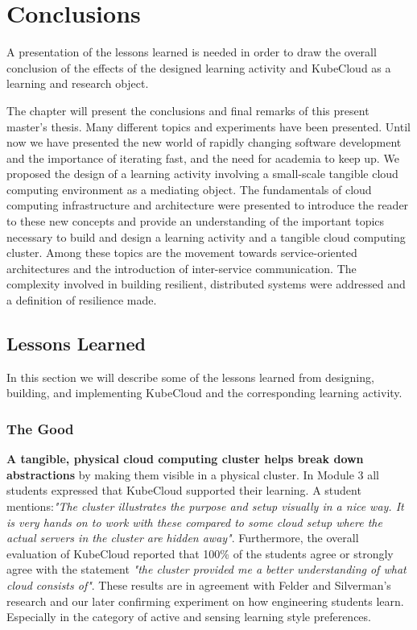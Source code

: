 \chapter{Conclusions}

\begin{theorem}
A presentation of the lessons learned is needed in order to draw the overall conclusion of the effects of the designed learning activity and KubeCloud as a learning and research object.
\end{theorem}

\noindent
The chapter will present the conclusions and final remarks of this present master's thesis. Many different topics and experiments have been presented. Until now we have presented the new world of rapidly changing software development and the importance of iterating fast, and the need for academia to keep up. We proposed the design of a learning activity involving a small-scale tangible cloud computing environment as a mediating object. The fundamentals of cloud computing infrastructure and architecture were presented to introduce the reader to these new concepts and provide an understanding of the important topics necessary to build and design a learning activity and a tangible cloud computing cluster. Among these topics are the movement towards service-oriented architectures and the introduction of inter-service communication. The complexity involved in building resilient, distributed systems were addressed and a definition of resilience made.


\section{Lessons Learned}
In this section we will describe some of the lessons learned from designing, building, and implementing KubeCloud and the corresponding learning activity.
\subsection*{The Good}

\textbf{A tangible, physical cloud computing cluster helps break down abstractions} by making them visible in a physical cluster. In Module 3 all students expressed that KubeCloud supported their learning. A student mentions:\textit{"The cluster illustrates the purpose and setup visually in a nice way. It is very hands on to work with these compared to some cloud setup where the actual servers in the cluster are hidden away"}. Furthermore, the overall evaluation of KubeCloud reported that 100\% of the students agree or strongly agree with the statement \textit{"the cluster provided me a better understanding of what cloud consists of"}. These results are in agreement with Felder and Silverman's research and our later confirming experiment on how engineering students learn. Especially in the category of active and sensing learning style preferences. \\

